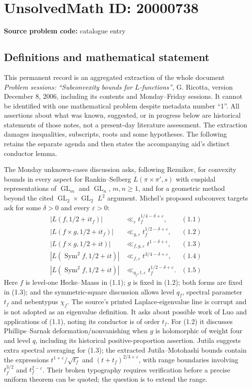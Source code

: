 \documentclass[11pt]{article}
\begin{document}
\section*{UnsolvedMath ID: 20000738}
\textbf{Source problem code:} catalogue entry
\subsection{Definitions and mathematical statement}
This permanent record is an aggregated extraction of the whole document \emph{Problem sessions: ``Subconvexity bounds for $L$-functions''}, G. Ricotta, version December 8, 2006, including its contents and Monday--Friday sessions. It cannot be identified with one mathematical problem despite metadata number ``1''. All assertions about what was known, suggested, or in progress below are historical statements of those notes, not a present-day literature assessment. The extraction damages inequalities, subscripts, roots and some hypotheses. The following retains the separate agenda and then states the accompanying aid's distinct conductor lemma.

The Monday unknown-cases discussion asks, following Reznikov, for convexity bounds in every aspect for Rankin--Selberg $L(\pi\times\pi',s)$ with cuspidal representations of $\operatorname{GL}_m$ and $\operatorname{GL}_n$, $m,n\geq1$, and for a geometric method beyond the cited $\operatorname{GL}_2\times\operatorname{GL}_2$ $L^2$ argument. Michel's proposed subconvex targets ask for some $\delta>0$ and every $\varepsilon>0$:
\[
 \begin{aligned}
 |L(f,1/2+it_f)|&\ll_\varepsilon t_f^{1/4-\delta+\varepsilon},&(1.1)\\
 |L(f\times g,1/2+it_f)|&\ll_{g,\varepsilon}t_f^{1/2-\delta+\varepsilon},&(1.2)\\
 |L(f\times g,1/2+it)|&\ll_{f,g,\varepsilon}t^{1-\delta+\varepsilon},&(1.3)\\
 |L(\operatorname{Sym}^2 f,1/2+it)|&\ll_{f,\varepsilon}t^{3/4-\delta+\varepsilon},&(1.4)\\
 |L(\operatorname{Sym}^2 f,1/2+it)|&\ll_{q_f,t,\varepsilon}t_f^{1/2-\delta+\varepsilon}.&(1.5)
 \end{aligned}
\]
Here $f$ is level-one Hecke--Maass in (1.1); $g$ is fixed in (1.2); both forms are fixed in (1.3); and the symmetric-square discussion allows level $q_f$, spectral parameter $t_f$ and nebentypus $\chi_f$. The source's printed Laplace-eigenvalue line is corrupt and is not adopted as an eigenvalue definition. It asks about possible work of Luo and applications of (1.1), noting its conductor is of order $t_f$. For (1.2) it discusses Phillips--Sarnak deformation/nonvanishing when $g$ is holomorphic of weight four and level $q$, including its historical positive-proportion assertion. Jutila suggests extra spectral averaging for (1.3); the extracted Jutila--Motohashi bounds contain the expressions $t^{1+\varepsilon}/\sqrt{t_f}$ and $(t+t_f)^{2/3+\varepsilon}$, with range boundaries involving $t_f^{3/2}$ and $t_f^{2-\varepsilon}$. Their broken typography requires verification before a precise uniform theorem can be quoted; the question is to extend the range.
\end{document}
